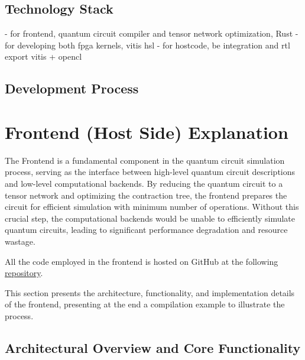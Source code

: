 \documentclass[12pt,oneside,a4paper]{article}
\begin{document}
\subsection{Technology Stack}
- for frontend, quantum circuit compiler and tensor network optimization, Rust
- for developing both fpga kernels, vitis hsl
- for hostcode, be integration and rtl export vitis + opencl

\subsection{Development Process}



\section{Frontend (Host Side) Explanation}


The Frontend is a fundamental component in the quantum circuit simulation process, serving as the interface between high-level quantum circuit descriptions and low-level computational backends. By reducing the quantum circuit to a tensor network and optimizing the contraction tree, the frontend prepares the circuit for efficient simulation with minimum number of operations. Without this crucial step, the computational backends would be unable to efficiently simulate quantum circuits, leading to significant performance degradation and resource wastage.

All the code employed in the frontend is hosted on GitHub at the following \href{https://github.com/federico123579/HPPS24-Quantum-Simulation}{repository}.

This section presents the architecture, functionality, and implementation details of the frontend, presenting at the end a compilation example to illustrate the process.

\subsection{Architectural Overview and Core Functionality}
\end{document}
